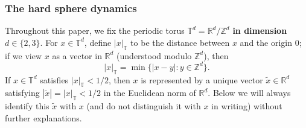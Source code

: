 \documentclass[10pt, reqno]{amsart}
\newcommand{\Rb}{\mathbb R}
\newcommand{\Tb}{\mathbb T}
\newcommand{\Zb}{\mathbb Z}
\theoremstyle{definition}
\theoremstyle{remark}
\numberwithin{equation}{section}
\begin{document}
\subsubsection{The hard sphere dynamics}\label{sec.hard_sphere}
Throughout this paper, we fix the periodic torus $\Tb^d=\Rb^d/\Zb^d$ \textbf{in dimension $d\in\{2,3\}$}. For $x\in\Tb^d$, define $|x|_\Tb$ to be the distance between $x$ and the origin $0$; if we view $x$ as a vector in $\Rb^d$ (understood modulo $\Zb^d$), then
\begin{equation}\label{eq.Tdnorm}|x|_\Tb=\min\big\{|x-y|:y\in\Zb^d\big\}.
\end{equation} If $x\in\Tb^d$ satisfies $|x|_\Tb<1/2$, then $x$ is represented by a unique vector $\widetilde{x}\in\Rb^d$ satisfying $|\widetilde{x}|=|x|_\Tb<1/2$ in the Euclidean norm of $\Rb^d$. Below we will always identify this $\widetilde{x}$ with $x$ (and do not distinguish it with $x$ in writing) without further explanations. 
\end{document}
